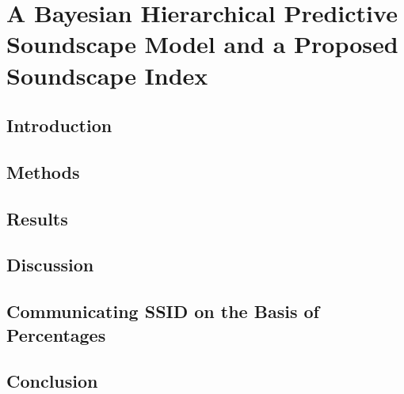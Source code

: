 \chapter{A Bayesian Hierarchical Predictive Soundscape Model and a Proposed Soundscape Index}
\label{ch:bayes}

\section{Introduction}

\section{Methods}

\section{Results}

\section{Discussion}

\section{Communicating SSID on the Basis of Percentages}

\section{Conclusion}

